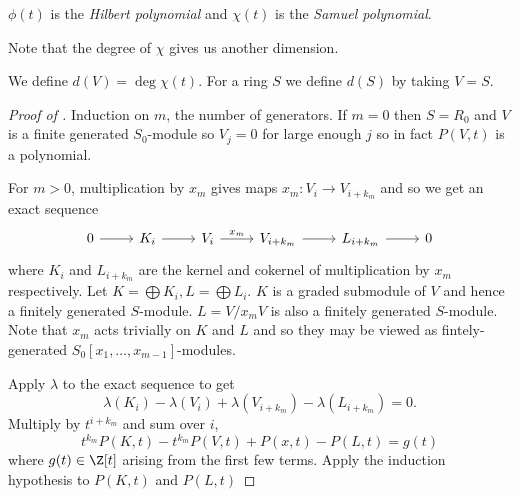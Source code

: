 \documentclass[a4paper]{article}
\begin{document}
\begin{definition}
  \(\phi(t)\) is the \emph{Hilbert polynomial} and \(\chi(t)\) is the \emph{Samuel polynomial}.
\end{definition}

Note that the degree of \(\chi\) gives us another dimension.

\begin{definition}
  We define \(d(V) = \deg \chi(t)\). For a ring \(S\) we define \(d(S)\) by taking \(V = S\).
\end{definition}

\begin{proof}[Proof of ]
  Induction on \(m\), the number of generators. If \(m = 0\) then \(S = R_0\) and \(V\) is a finite generated \(S_0\)-module so \(V_j = 0\) for large enough \(j\) so in fact \(P(V, t)\) is a polynomial.

  For \(m > 0\), multiplication by \(x_m\) gives maps \(x_m: V_i \to V_{i + k_m}\) and so we get an exact sequence
  \[
    \begin{tikzcd}
      0 \ar[r] & K_i \ar[r] & V_i \ar[r, "x_m"] & V_{i + k_m} \ar[r] & L_{i + k_m} \ar[r] & 0
    \end{tikzcd}
  \]
  where \(K_i\) and \(L_{i + k_m}\) are the kernel and cokernel of multiplication by \(x_m\) respectively. Let \(K = \bigoplus K_i, L = \bigoplus L_i\). \(K\) is a graded submodule of \(V\) and hence a finitely generated \(S\)-module. \(L = V/x_m V\) is also a finitely generated \(S\)-module. Note that \(x_m\) acts trivially on \(K\) and \(L\) and so they may be viewed as fintely-generated \(S_0[x_1, \dots, x_{m - 1}]\)-modules.

  Apply \(\lambda\) to the exact sequence to get
  \[
    \lambda(K_i) - \lambda(V_i) + \lambda(V_{i + k_m}) - \lambda(L_{i + k_m}) = 0.
  \]
  Multiply by \(t^{i + k_m}\) and sum over \(i\),
  \[
    t^{k_m} P(K, t) - t^{k_m} P(V, t) + P(x, t) - P(L, t) = g(t)
  \]
  where \(g(t) \in \Z[t]\) arising from the first few terms. Apply the induction hypothesis to \(P(K, t)\) and \(P(L, t)\)
\end{proof}
\end{document}
